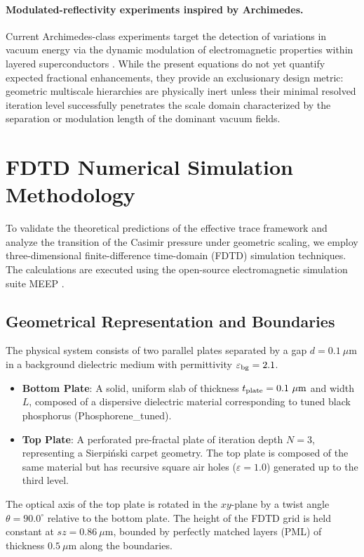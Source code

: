 \documentclass[12pt,letterpaper]{article}
\begin{document}
\paragraph{Modulated-reflectivity experiments inspired by Archimedes.}
Current Archimedes-class experiments target the detection of variations in vacuum energy via the dynamic modulation of electromagnetic properties within layered superconductors \cite{avino2020}.
While the present equations do not yet quantify expected fractional enhancements, they provide an exclusionary design metric: geometric multiscale hierarchies are physically inert unless their minimal resolved iteration level successfully penetrates the scale domain characterized by the separation or modulation length of the dominant vacuum fields.



\section{FDTD Numerical Simulation Methodology}
\label{sec:fdtd_methodology}

To validate the theoretical predictions of the effective trace framework and analyze the transition of the Casimir pressure under geometric scaling, we employ three-dimensional finite-difference time-domain (FDTD) simulation techniques. The calculations are executed using the open-source electromagnetic simulation suite MEEP \cite{oskooi2010}.

\subsection{Geometrical Representation and Boundaries}
The physical system consists of two parallel plates separated by a gap $d = 0.1\ \mu\text{m}$ in a background dielectric medium with permittivity $\varepsilon_{\rm bg} = 2.1$. 
\begin{itemize}
    \item \textbf{Bottom Plate}: A solid, uniform slab of thickness $t_{\rm plate} = 0.1\ \mu\text{m}$ and width $L$, composed of a dispersive dielectric material corresponding to tuned black phosphorus (Phosphorene\_tuned).
    \item \textbf{Top Plate}: A perforated pre-fractal plate of iteration depth $N = 3$, representing a Sierpi\'nski carpet geometry. The top plate is composed of the same material but has recursive square air holes ($\varepsilon = 1.0$) generated up to the third level.
\end{itemize}
The optical axis of the top plate is rotated in the $xy$-plane by a twist angle $\theta = 90.0^\circ$ relative to the bottom plate. The height of the FDTD grid is held constant at $sz = 0.86\ \mu\text{m}$, bounded by perfectly matched layers (PML) of thickness $0.5\ \mu\text{m}$ along the boundaries.
\end{document}
